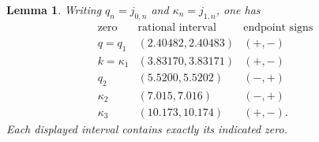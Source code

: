 \documentclass[11pt,letterpaper,reqno]{amsart}
\newtheorem{lemma}[theorem]{Lemma}
\theoremstyle{definition}
\begin{document}
\begin{lemma}

Writing $q_n=j_{0,n}$ and $\kappa_n=j_{1,n}$, one has
\begin{equation}\label{subm:root-boxes}
\begin{array}{c|c|c}
 \text{zero}&\text{rational interval}&\text{endpoint signs}\\\hline
 q=q_1&(2.40482,2.40483)&(+,-)\\
 k=\kappa_1&(3.83170,3.83171)&(+,-)\\
 q_2&(5.5200,5.5202)&(-,+)\\
 \kappa_2&(7.015,7.016)&(-,+)\\
 \kappa_3&(10.173,10.174)&(+,-).
\end{array}
\end{equation}
Each displayed interval contains exactly its indicated zero.
\end{lemma}
\end{document}
